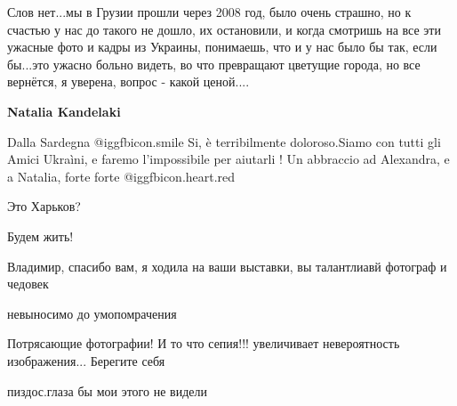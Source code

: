  
 
 
 
 
\zzSecCmt

\begin{itemize} %

Слов нет...мы в Грузии прошли через 2008 год, было очень страшно, но к счастью
у нас до такого не дошло, их остановили, и когда смотришь на все эти ужасные
фото и кадры из Украины, понимаешь, что и у нас было бы так, если бы...это
ужасно больно видеть, во что превращают цветущие города, но все вернётся, я
уверена, вопрос - какой ценой....

\textbf{Natalia Kandelaki}

Dalla Sardegna  @igg{fbicon.smile}  Si, è terribilmente doloroso.Siamo con tutti gli Amici
Ukraìni, e faremo l'impossibile per aiutarli ! Un abbraccio ad Alexandra, e a
Natalia, forte forte @igg{fbicon.heart.red}

Это Харьков?

Будем жить!

Владимир, спасибо вам, я ходила на ваши выставки, вы талантлиавй фотограф и чедовек

невыносимо до умопомрачения

Потрясающие фотографии! И то что сепия!!! увеличивает невероятность изображения... Берегите себя

пиздос.глаза бы мои этого не видели

\end{itemize} %
